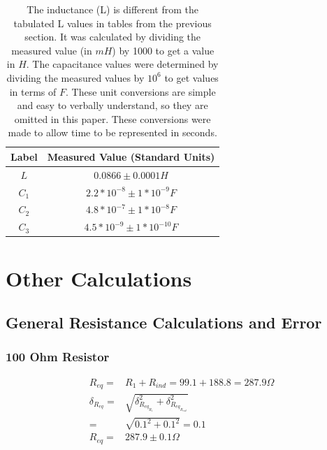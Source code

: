 \documentclass[12pt]{article}
\begin{document}
\begin{table}[h]
\centering
\begin{tabular}{|c|c|}
\hline
\textbf{Label} & \textbf{Measured Value (Standard Units)} \\
\hline
$L$  & $0.0866 \pm 0.0001H$ \\
$C_1$  & $2.2*10^{-8} \pm 1*10^{-9}F$ \\
$C_2$  & $4.8*10^{-7} \pm 1*10^{-8}F$ \\
$C_3$  & $4.5*10^{-9} \pm 1*10^{-10}F$ \\
\hline
\end{tabular}
\caption{The inductance (L) is different from the tabulated L values in tables from the previous section. It was calculated by dividing the measured value (in $mH$) by 1000 to get a value in $H$. The capacitance values were determined by dividing the measured values by $10^6$ to get values in terms of $F$. These unit conversions are simple and easy to verbally understand, so they are omitted in this paper. These conversions were made to allow time to be represented in seconds.}
\label{tab:other_measured_values}
\end{table}

\section{Other Calculations}
\subsection{General Resistance Calculations and Error}
\subsubsection{100 Ohm Resistor} \label{subsub:100R}
\begin{align}
R_{eq}=&R_1 + R_{ind}=99.1+188.8=287.9\Omega \nonumber \\
\delta_{R_{eq}}=&\sqrt{\delta_{R_{{eq}_{R_1}}}^2+\delta_{R_{{eq}_{R_{ind}}}}^2} \nonumber \\
=&\sqrt{0.1^2+0.1^2}=0.1 \nonumber \\
R_{eq}=&287.9\pm0.1\Omega \label{eq:100R_w_Inductor}
\end{align}
\end{document}
